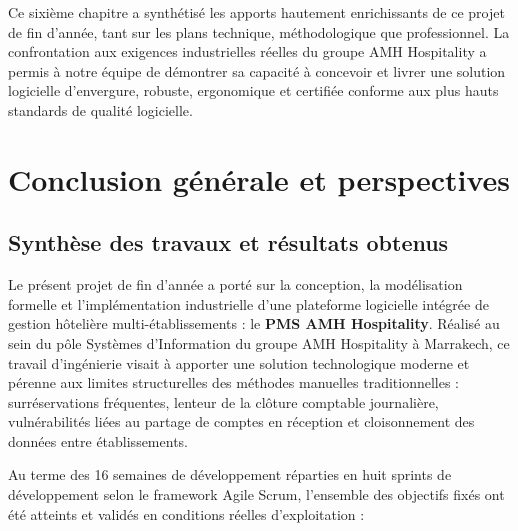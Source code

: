 \documentclass[12pt,a4paper,oneside]{report}
\begin{document}
Ce sixième chapitre a synthétisé les apports hautement enrichissants de ce projet de fin d'année, tant sur les plans technique, méthodologique que professionnel. La confrontation aux exigences industrielles réelles du groupe AMH Hospitality a permis à notre équipe de démontrer sa capacité à concevoir et livrer une solution logicielle d'envergure, robuste, ergonomique et certifiée conforme aux plus hauts standards de qualité logicielle.

\chapter*{Conclusion générale et perspectives}

\section*{Synthèse des travaux et résultats obtenus}

Le présent projet de fin d'année a porté sur la conception, la modélisation formelle et l'implémentation industrielle d'une plateforme logicielle intégrée de gestion hôtelière multi-établissements : le \textbf{PMS AMH Hospitality}. Réalisé au sein du pôle Systèmes d'Information du groupe AMH Hospitality à Marrakech, ce travail d'ingénierie visait à apporter une solution technologique moderne et pérenne aux limites structurelles des méthodes manuelles traditionnelles : surréservations fréquentes, lenteur de la clôture comptable journalière, vulnérabilités liées au partage de comptes en réception et cloisonnement des données entre établissements.

Au terme des 16 semaines de développement réparties en huit sprints de développement selon le framework Agile Scrum, l'ensemble des objectifs fixés ont été atteints et validés en conditions réelles d'exploitation :
\end{document}
